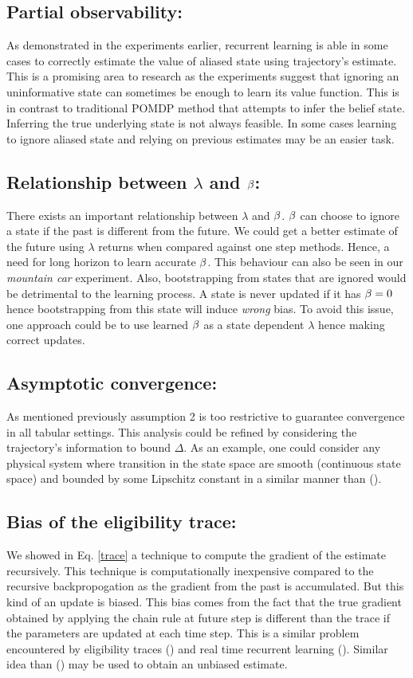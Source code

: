 \subsection{Partial observability:} As demonstrated in the experiments earlier, recurrent learning is able in some cases to correctly estimate the value of aliased state using trajectory's estimate. This is a promising area to research as the experiments suggest that ignoring an uninformative state can sometimes be enough to learn its value function. This is in contrast to traditional POMDP method that attempts to infer the belief state. Inferring the true underlying state is not always feasible. In some cases learning to ignore aliased state and relying on previous estimates may be an easier task.
\subsection{Relationship between $\lambda$ and $\beta$:} There exists an important relationship between $\lambda$ and $\beta$. $\beta$ can choose to ignore a state if the past is different from the future. We could get a better estimate of the future using $\lambda$ returns when compared against one step methods. Hence, a need for long horizon to learn accurate $\beta$. This behaviour can also be seen in our \emph{mountain car} experiment. Also, bootstrapping from states that are ignored would be detrimental to the learning process. A state is never updated if it has $\beta=0$ hence bootstrapping from this state will induce \emph{wrong} bias. To avoid this issue, one approach could be to use learned $\beta$ as a state dependent $\lambda$ hence making correct updates.
\subsection{Asymptotic convergence:} As mentioned previously assumption 2 is too restrictive to guarantee convergence in all tabular settings. This analysis could be refined by considering the trajectory's information to bound $\Delta$. As an example, one could consider any physical system where transition in the state space are smooth (continuous state space) and bounded by some Lipschitz constant in a similar manner than (\cite{shah2018q}). 
\subsection{Bias of the eligibility trace:}
We showed in Eq. \eqref{trace} a technique to compute the gradient of the estimate recursively. This technique is computationally inexpensive compared to the recursive backpropogation as the gradient from the past is accumulated. But this kind of an update is biased. This bias comes from the fact that the true gradient obtained by applying the chain rule at future step is different than the trace if the parameters are updated at each time step. This is a similar problem encountered by eligibility traces (\cite{seijen2014true}) and real time recurrent learning (\cite{williams1995gradient}). Similar idea than (\cite{seijen2014true}) may be used to obtain an unbiased estimate.







 
